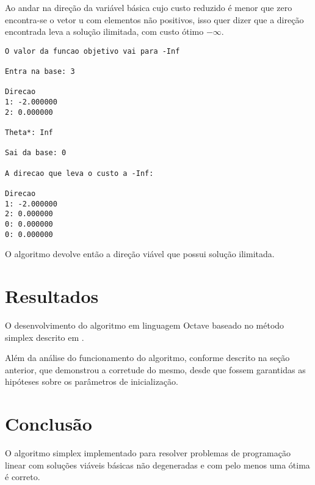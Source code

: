 \documentclass[
	12pt,				%
	openright,			%
	oneside,			%
	a4paper,			%
	english,			%
	french,				%
	spanish,			%
	brazil,				%
	]{abntex2}
\begin{document}
Ao andar na direção da variável básica cujo custo reduzido é menor que zero encontra-se o vetor u com elementos não positivos, isso quer dizer que a direção encontrada leva a solução ilimitada, com custo ótimo $-\infty$.

\begin{verbatim}
O valor da funcao objetivo vai para -Inf

Entra na base: 3

Direcao
1: -2.000000
2: 0.000000

Theta*: Inf

Sai da base: 0

A direcao que leva o custo a -Inf:

Direcao
1: -2.000000
2: 0.000000
0: 0.000000
0: 0.000000
\end{verbatim}

O algoritmo devolve então a direção viável que possui solução ilimitada.

 
%
%
\chapter{Resultados}

O desenvolvimento do algoritmo em linguagem Octave baseado no método simplex descrito em .

Além da análise do funcionamento do algoritmo, conforme descrito na seção anterior, que demonstrou a corretude do mesmo, desde que fossem garantidas as hipóteses sobre os parâmetros de inicialização.

%

\chapter*[Conclusão]{Conclusão}
O algoritmo simplex implementado para resolver problemas de programação linear com 
soluções viáveis básicas não degeneradas e com pelo menos uma ótima é correto.
\end{document}
